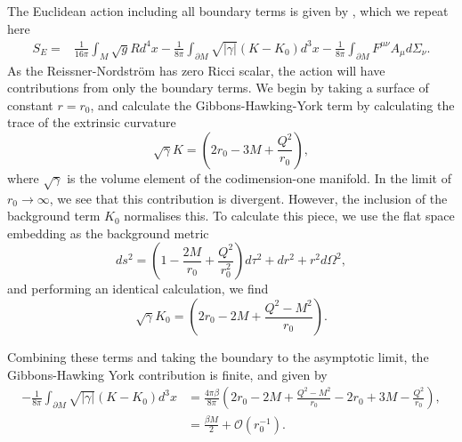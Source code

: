 The Euclidean action including all boundary terms is given by , which we repeat here
\begin{equation*}
\begin{aligned}
		S_E = & \frac{1}{16 \pi} \int_{M} \sqrt{g} R d^4 x - \frac{1}{8\pi} \int_{\partial M} \sqrt{|\gamma|}(K-K_0) d^3x -\frac{1}{8\pi} \int_{\partial M} F^{\mu \nu}A_\mu d\Sigma_\nu .\end{aligned}
\end{equation*}
As the Reissner-Nordstr\"om has zero Ricci scalar, the action will have contributions from only the boundary terms. We begin by taking a surface of constant $r = r_0$, and calculate the Gibbons-Hawking-York term by calculating the trace of the extrinsic curvature  
\begin{equation*}
	\sqrt{\gamma} K = \left(2r_0 - 3M + \frac{Q^2}{r_0} \right),
\end{equation*}
where $\sqrt{\gamma}$ is the volume element of the codimension-one manifold. In the limit of $r_0 \rightarrow \infty$, we see that this contribution is divergent. However, the inclusion of the background term $K_0$ normalises this. To calculate this piece, we use the flat space embedding as the background metric
\begin{equation*}
	ds^2 = \left(1 - \frac{2M}{r_0} + \frac{Q^2}{r_0^2} \right) d\tau^2 + dr^2 + r^2 d\Omega^2,
\end{equation*}
and performing an identical calculation, we find
\begin{equation*}
	\sqrt{\gamma} K_0 = \left(2r_0 - 2M + \frac{Q^2-M^2}{r_0} \right).
\end{equation*}

Combining these terms and taking the boundary to the asymptotic limit, the Gibbons-Hawking York contribution is finite, and given by
\begin{equation*}
	\begin{aligned}
		- \frac{1}{8\pi} \int_{\partial M} \sqrt{|\gamma|}(K-K_0) d^3x  &= \frac{4\pi \beta}{8 \pi} \left(2r_0 - 2M + \frac{Q^2-M^2}{r_0} - 2r_0 + 3M - \frac{Q^2}{r_0}\right), \\
		&= \frac{\beta M}{2} + \mathcal{O}(r_0^{-1}).
	\end{aligned}
\end{equation*}

